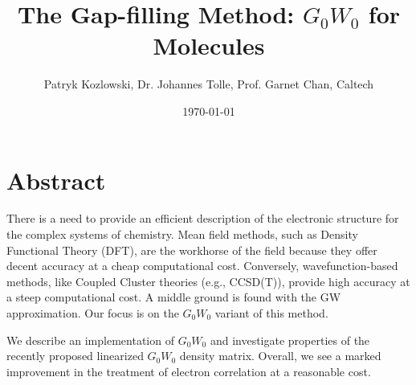 \documentclass{article}
\title{The Gap-filling Method: $G_0W_0$ for Molecules}
\author{Patryk Kozlowski, Dr. Johannes Tolle, Prof. Garnet Chan, Caltech}
\date{\today}
\begin{document}
\maketitle

\section*{Abstract}

There is a need to provide an efficient description of the electronic structure for the complex systems of chemistry. Mean field methods, such as Density Functional Theory (DFT), are the workhorse of the field because they offer decent accuracy at a cheap computational cost. Conversely, wavefunction-based methods, like Coupled Cluster theories (e.g., CCSD(T)), provide high accuracy at a steep computational cost. A middle ground is found with the GW approximation. Our focus is on the $G_0W_0$ variant of this method.

We describe an implementation of $G_0W_0$ and investigate properties of the recently proposed linearized $G_0W_0$ density matrix. Overall, we see a marked improvement in the treatment of electron correlation at a reasonable cost.
\end{document}
